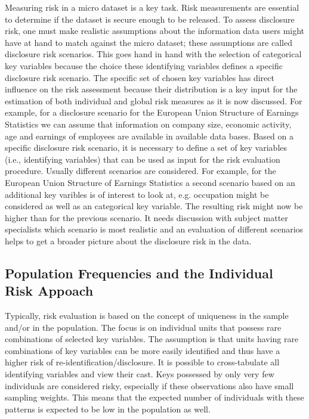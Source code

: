 \documentclass[12pt]{scrartcl}\usepackage[]{graphicx}\usepackage[]{color}
\begin{document}
Measuring risk in a micro dataset is a key task. Risk measurements are essential to determine if the dataset is secure enough to be released. To assess disclosure risk, one must make realistic assumptions about the information data users might have at hand to match against the micro dataset; these assumptions are called disclosure risk scenarios. This goes hand in hand with the selection of categorical key variables because the choice these identifying variables defines a specific disclosure risk scenario. The specific set of chosen key variables has direct influence on the risk assessment because their distribution is a key input for the estimation of both individual and global risk measures as it is now discussed. For example, for a disclosure scenario for the European Union Structure of Earnings Statistics we can assume that information on company size, economic activity, age and earnings of employees are available in available data bases. Based on a specific disclosure risk scenario, it is necessary to define a set of key variables (i.e., identifying variables) that can be used as input for the risk evaluation procedure. Usually different scenarios are considered. For example, for the European Union Structure of Earnings Statistics a second scenario based on an additional key varibles is of interest to look at, e.g. occupation might be considered as well as an categorical key variable. The resulting risk might now be higher than for the previous scenario. It needs discussion with subject matter specialists which scenario is most realistic and an evaluation of different scenarios helps to get a broader picture about the disclosure risk in the data.

\subsection{Population Frequencies and the Individual Risk Appoach}\label{method:Freq}
Typically, risk evaluation is based on the concept of uniqueness in the sample and/or in the population. The focus is on individual units that possess rare combinations of selected key variables. The assumption is that units having rare combinations of key variables can be more easily identified and thus have a higher risk of re-identification/disclosure. It is possible to cross-tabulate all identifying variables and view their cast. Keys possessed by only very few individuals are considered risky, especially if these observations also have small sampling weights. This means that the expected number of individuals with these patterns is expected to be low in the population as well.
\end{document}
